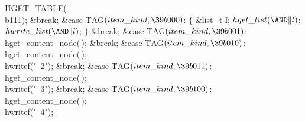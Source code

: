 \.{HGET\_TABLE}(\\{b111});\5
\&{break};\7
\4\&{case} \.{TAG}${}(\index{item kind+\\{item\_kind}}\\{item\_kind},\39\\{b000}){}$:\5
\1${}\{{}$\5
\&{list\_t} \|l;\5
${}\index{hget list+\\{hget\_list}}\\{hget\_list}({\AND}\|l){}$;\5
${}\index{hwrite list+\\{hwrite\_list}}\\{hwrite\_list}({\AND}\|l){}$;\5
${}\}{}$\5
\2\&{break};\6
\4\&{case} \.{TAG}${}(\index{item kind+\\{item\_kind}}\\{item\_kind},\39\\{b001}){}$:\5
\\{hget\_content\_node}(\,);\5
\&{break};\6
\4\&{case} \.{TAG}${}(\index{item kind+\\{item\_kind}}\\{item\_kind},\39\\{b010}){}$:\5
\\{hget\_content\_node}(\,);\5
\\{hwritef}(\.{"\ 2"});\5
\&{break};\6
\4\&{case} \.{TAG}${}(\index{item kind+\\{item\_kind}}\\{item\_kind},\39\\{b011}){}$:\5
\\{hget\_content\_node}(\,);\5
\\{hwritef}(\.{"\ 3"});\5
\&{break};\6
\4\&{case} \.{TAG}${}(\index{item kind+\\{item\_kind}}\\{item\_kind},\39\\{b100}){}$:\5
\\{hget\_content\_node}(\,);\5
\\{hwritef}(\.{"\ 4"});\5
